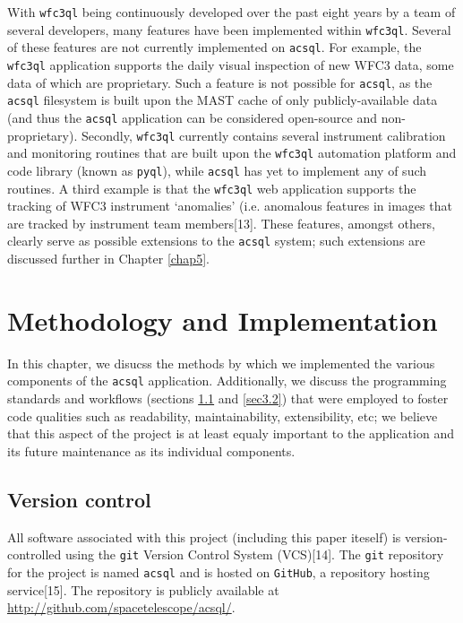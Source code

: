\documentclass[10pt,journal,compsoc]{IEEEtran}
\begin{document}
With \texttt{wfc3ql} being continuously developed over the past eight years by a team of several developers, many features have been implemented within \texttt{wfc3ql}.  Several of
these features are not currently implemented on \texttt{acsql}.  For example, the \texttt{wfc3ql} application supports the daily visual inspection of new WFC3 data, some data of which
are proprietary.  Such a feature is not possible for \texttt{acsql}, as the \texttt{acsql} filesystem is built upon the MAST cache of only publicly-available data (and thus the \texttt{acsql}
application can be considered open-source and non-proprietary).  Secondly, \texttt{wfc3ql} currently contains several instrument calibration and monitoring routines that are built upon
the \texttt{wfc3ql} automation platform and code library (known as \texttt{pyql}), while \texttt{acsql} has yet to implement any of such routines.  A third example is that the \texttt{wfc3ql}
web application supports the tracking of WFC3 instrument `anomalies' (i.e. anomalous features in images that are tracked by instrument team members[13]. These features, amongst others,
clearly serve as possible extensions to the \texttt{acsql} system; such extensions are discussed further in Chapter \ref{chap5}.


\section{Methodology and Implementation} \label{chap3}

In this chapter, we disucss the methods by which we implemented the various components of the \texttt{acsql} application.  Additionally, we discuss the programming standards and
workflows (sections \ref{sec3.1} and \ref{sec3.2}) that were employed to foster code qualities such as readability, maintainability, extensibility, etc; we believe that this aspect
of the project is at least equaly important to the application and its future maintenance as its individual components.


\subsection{Version control} \label{sec3.1}

All software associated with this project (including this paper iteself) is version-controlled using the \texttt{git} Version Control System (VCS)[14]. The \texttt{git} repository for the
project is named \texttt{acsql} and is hosted on \texttt{GitHub}, a repository hosting service[15].  The repository is publicly available at
\textcolor{blue}{\url{http://github.com/spacetelescope/acsql/}}.
\end{document}
